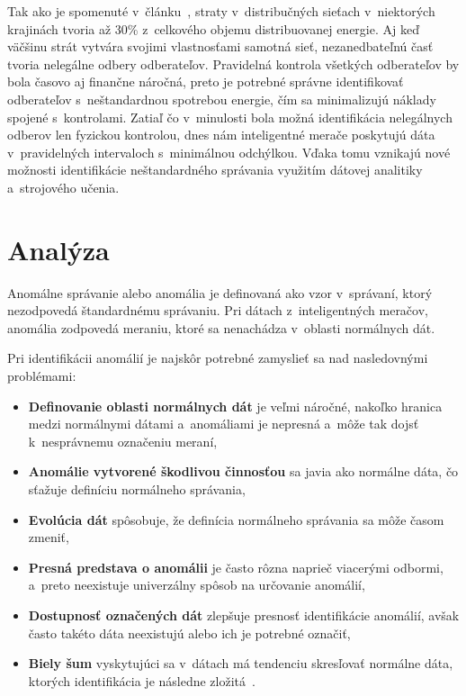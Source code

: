 \documentclass[a4paper,twoside,slovak,12pt]{article}
\begin{document}
Tak ako je spomenuté v~článku~\cite{Meffe2009}, straty v~distribučných sieťach
v~niektorých krajinách tvoria až 30\% z~celkového objemu distribuovanej energie.
Aj keď väčšinu strát vytvára svojimi vlastnosťami samotná sieť, nezanedbateľnú
časť tvoria nelegálne odbery odberateľov.
Pravidelná kontrola všetkých odberateľov by bola časovo aj finančne náročná,
preto je potrebné správne identifikovať odberateľov s~neštandardnou spotrebou
energie, čím sa minimalizujú náklady spojené s~kontrolami. Zatiaľ čo v~minulosti
bola možná identifikácia nelegálnych odberov len fyzickou kontrolou, dnes nám
inteligentné merače poskytujú dáta v~pravidelných intervaloch s~minimálnou
odchýlkou. Vďaka tomu vznikajú nové možnosti identifikácie neštandardného
správania využitím dátovej analitiky a~strojového učenia.



\section{Analýza}
Anomálne správanie alebo anomália je definovaná ako vzor v~správaní, ktorý
nezodpovedá štandardnému správaniu. Pri dátach z~inteligentných meračov, anomália
zodpovedá meraniu, ktoré sa nenachádza v~oblasti normálnych dát.

Pri identifikácii anomálií je najskôr potrebné zamyslieť sa nad nasledovnými
problémami:

\begin{itemize}[noitemsep]
\item \textbf{Definovanie oblasti normálnych dát} je veľmi náročné, nakoľko
hranica medzi normálnymi dátami a~anomáliami je nepresná a~môže tak dojsť
k~nesprávnemu označeniu meraní,
\item \textbf{Anomálie vytvorené škodlivou činnosťou} sa javia ako normálne dáta,
čo sťažuje definíciu normálneho správania,
\item \textbf{Evolúcia dát} spôsobuje, že definícia normálneho správania sa môže
časom zmeniť,
\item \textbf{Presná predstava o anomálii} je často rôzna naprieč viacerými
odbormi, a~preto neexistuje univerzálny spôsob na určovanie anomálií,
\item \textbf{Dostupnosť označených dát} zlepšuje presnosť identifikácie anomálií,
avšak často takéto dáta neexistujú alebo ich je potrebné označiť,
\item \textbf{Biely šum} vyskytujúci sa v~dátach má tendenciu skresľovať
normálne dáta, ktorých identifikácia je následne zložitá~\cite{Chandola2009}.
\end{itemize}
\end{document}
